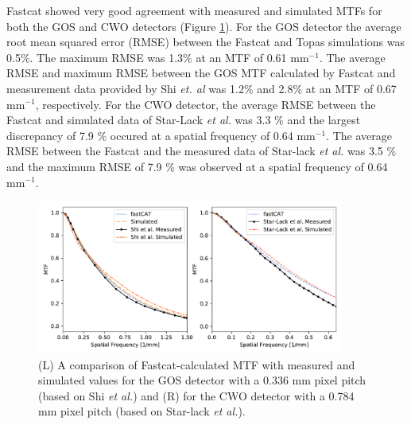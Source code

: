 Fastcat showed very good agreement with measured and simulated MTFs for both the GOS and CWO detectors (Figure \ref{MTF_comparison}). For the GOS detector the average root mean squared error (RMSE) between the Fastcat and Topas simulations was 0.5\%. The maximum RMSE was 1.3\% at an MTF of 0.61 mm$^{-1}$. The average RMSE and maximum RMSE between the GOS MTF calculated by Fastcat and measurement data provided by Shi \textit{et. al} was 1.2\% and 2.8\% at an MTF of 0.67 mm$^{-1}$, respectively. For the CWO detector, the average RMSE between the Fastcat and simulated data of Star-Lack \textit{et al.} was 3.3 \% and the largest discrepancy of  7.9 \% occured at a spatial frequency of 0.64 mm$^{-1}$. The average RMSE between the Fastcat and the measured data of Star-lack \textit{et al.} was 3.5 \% and the maximum RMSE of 7.9 \% was observed at a spatial frequency of 0.64 mm$^{-1}$.

\begin{figure}[t!]
   \begin{center}
   \includegraphics[width=0.9\textwidth]{figures/MTF.pdf}
   \caption{
   (L) A comparison of Fastcat-calculated MTF with measured and simulated values for the GOS detector with a 0.336 mm pixel pitch (based on Shi \textit{et al.})  and (R) for the CWO detector with a 0.784 mm pixel pitch (based on Star-lack \textit{et al.}).
   \label{MTF_comparison} 
    }  %
    \end{center}
\end{figure}


